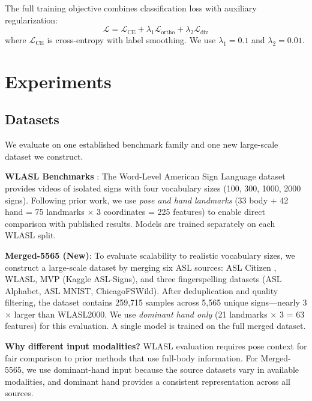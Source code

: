 \documentclass{article}
\theoremstyle{definition}
\theoremstyle{remark}
\begin{document}
The full training objective combines classification loss with auxiliary regularization:
\begin{equation}
\mathcal{L} = \mathcal{L}_{\text{CE}} + \lambda_1 \mathcal{L}_{\text{ortho}} + \lambda_2 \mathcal{L}_{\text{div}}
\end{equation}
where $\mathcal{L}_{\text{CE}}$ is cross-entropy with label smoothing. We use $\lambda_1 = 0.1$ and $\lambda_2 = 0.01$.


\section{Experiments}
\label{sec:experiments}

\subsection{Datasets}

We evaluate on one established benchmark family and one new large-scale dataset we construct.

\textbf{WLASL Benchmarks} \citep{li2020word}: The Word-Level American Sign Language dataset provides videos of isolated signs with four vocabulary sizes (100, 300, 1000, 2000 signs). Following prior work, we use \textit{pose and hand landmarks} (33 body + 42 hand = 75 landmarks $\times$ 3 coordinates = 225 features) to enable direct comparison with published results. Models are trained separately on each WLASL split.

\textbf{Merged-5565 (New)}: To evaluate scalability to realistic vocabulary sizes, we construct a large-scale dataset by merging six ASL sources: ASL Citizen \citep{desai2023asl}, WLASL, MVP (Kaggle ASL-Signs), and three fingerspelling datasets (ASL Alphabet, ASL MNIST, ChicagoFSWild). After deduplication and quality filtering, the dataset contains 259,715 samples across 5,565 unique signs---nearly 3$\times$ larger than WLASL2000. We use \textit{dominant hand only} (21 landmarks $\times$ 3 = 63 features) for this evaluation. A single model is trained on the full merged dataset.

\textbf{Why different input modalities?} WLASL evaluation requires pose context for fair comparison to prior methods that use full-body information. For Merged-5565, we use dominant-hand input because the source datasets vary in available modalities, and dominant hand provides a consistent representation across all sources.
\end{document}
